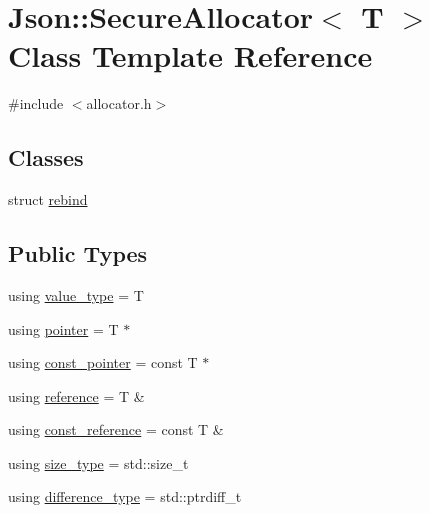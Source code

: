 \hypertarget{class_json_1_1_secure_allocator}{}\section{Json\+:\+:Secure\+Allocator$<$ T $>$ Class Template Reference}
\label{class_json_1_1_secure_allocator}


{\ttfamily \#include $<$allocator.\+h$>$}

\subsection*{Classes}
\begin{DoxyCompactItemize}
\item 
struct \hyperlink{struct_json_1_1_secure_allocator_1_1rebind}{rebind}
\end{DoxyCompactItemize}
\subsection*{Public Types}
\begin{DoxyCompactItemize}
\item 
using \hyperlink{class_json_1_1_secure_allocator_ae45a020fc6d6f3ae66394c81c4281ad8}{value\+\_\+type} = T
\item 
using \hyperlink{class_json_1_1_secure_allocator_a442c09b3267622d23416d9072ea1afe9}{pointer} = T $\ast$
\item 
using \hyperlink{class_json_1_1_secure_allocator_a464b356817c78ea996cd3a7403f7e735}{const\+\_\+pointer} = const T $\ast$
\item 
using \hyperlink{class_json_1_1_secure_allocator_a55b243c56812b3852b59c1a9b0a21c65}{reference} = T \&
\item 
using \hyperlink{class_json_1_1_secure_allocator_a3f0327d609dcd1942c8c7fa4d4f227e5}{const\+\_\+reference} = const T \&
\item 
using \hyperlink{class_json_1_1_secure_allocator_a61c258f0ae80af6982fae200b55a4dc9}{size\+\_\+type} = std\+::size\+\_\+t
\item 
using \hyperlink{class_json_1_1_secure_allocator_a404f41a8e340a8af1b54138920a6ef33}{difference\+\_\+type} = std\+::ptrdiff\+\_\+t
\end{DoxyCompactItemize}
